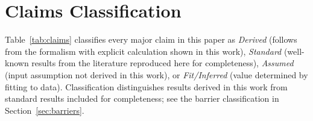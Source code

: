 \documentclass[aps,prd,twocolumn,superscriptaddress,showpacs,preprintnumbers,nofootinbib,longbibliography,floatfix]{revtex4-2}
\begin{document}
\section{Claims Classification}\label{app:claims}

Table~\ref{tab:claims} classifies every major claim in this paper as \textit{Derived} (follows from the formalism with explicit calculation shown in this work), \textit{Standard} (well-known results from the literature reproduced here for completeness), \textit{Assumed} (input assumption not derived in this work), or \textit{Fit/Inferred} (value determined by fitting to data). Classification distinguishes results derived in this work from standard results included for completeness; see the barrier classification in Section~\ref{sec:barriers}.
\end{document}
